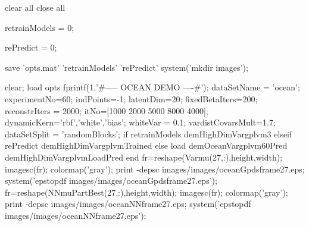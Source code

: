 \documentclass{article} %
\newenvironment{matlab}{\comment}{\endcomment}
\begin{document}
\begin{matlab}


clear all
close all

retrainModels = 0;

rePredict = 0;


save 'opts.mat' 'retrainModels' 'rePredict'
system('mkdir images');

clear; load opts
fprintf(1,'\n\n#-----  OCEAN DEMO ----#\n');
dataSetName = 'ocean';
experimentNo=60;
indPoints=-1; latentDim=20;
fixedBetaIters=200; reconstrIters = 2000;
itNo=[1000 2000 5000 8000 4000];
dynamicKern={'rbf','white','bias'};
whiteVar = 0.1;  vardistCovarsMult=1.7;
dataSetSplit = 'randomBlocks';
if retrainModels
    demHighDimVargplvm3
elseif rePredict
    demHighDimVargplvmTrained
else
    load demOceanVargplvm60Pred
    demHighDimVargplvmLoadPred
end
fr=reshape(Varmu(27,:),height,width); imagesc(fr); colormap('gray'); %
print -depsc images/images/oceanGpdsframe27.eps; system('epstopdf images/images/oceanGpdsframe27.eps');
fr=reshape(NNmuPartBest(27,:),height,width); imagesc(fr); colormap('gray'); %
print -depsc images/images/oceanNNframe27.eps; system('epstopdf images/images/oceanNNframe27.eps');


\end{matlab}
\end{document}
